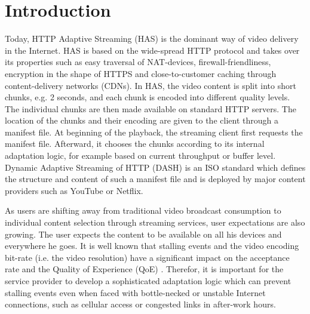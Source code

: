 
\section{Introduction}
\label{sec:introduction}

Today, HTTP Adaptive Streaming (HAS) is the dominant way of video delivery in the Internet. 
HAS is based on the wide-spread HTTP protocol and takes over its properties such as easy traversal of NAT-devices, firewall-friendliness, encryption in the shape of HTTPS and close-to-customer caching through content-delivery networks (CDNs).
In HAS, the video content is split into short chunks, e.g. 2 seconds, and each chunk is encoded into different quality levels.
The individual chunks are then made available on standard HTTP servers.
The location of the chunks and their encoding are given to the client through a manifest file.
At beginning of the playback, the streaming client first requests the manifest file. 
Afterward, it chooses the chunks according to its internal adaptation logic, for example based on current throughput or buffer level.
Dynamic Adaptive Streaming of HTTP (DASH) is an ISO standard which defines the structure and content of such a manifest file and is deployed by major content providers such as YouTube or Netflix.

As users are shifting away from traditional video broadcast consumption to individual content selection through streaming services, user expectations are also growing. 
The user expects the content to be available on all his devices and everywhere he goes. 
It is well known that stalling events and the video encoding bit-rate (i.e. the video resolution) have a significant impact on the acceptance rate and the Quality of Experience (QoE) \cite{casas2012youtube}.
Therefor, it is important for the service provider to develop a sophisticated adaptation logic which can prevent stalling events even when faced with bottle-necked or unstable Internet connections, such as cellular access or congested links in after-work hours.

